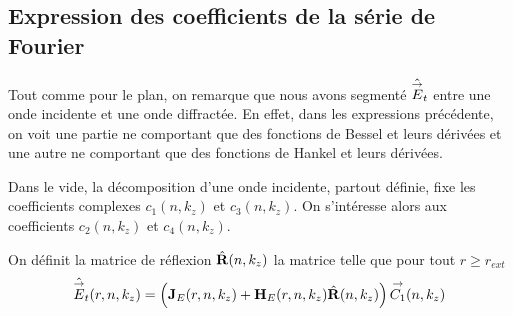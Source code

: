   \subsection{Expression des coefficients de la série de Fourier}

    Tout comme pour le plan, on remarque que nous avons segmenté \(\hat{{\overset{\rightarrow}{E}}}_t\) entre une onde incidente et une onde diffractée. En effet, dans les expressions précédente, on voit une partie ne comportant que des fonctions de Bessel et leurs dérivées et une autre ne comportant que des fonctions de Hankel et leurs dérivées.

    Dans le vide, la décomposition d'une onde incidente, partout définie, fixe les coefficients complexes \(c_1(n,k_z)\) et \(c_3(n,k_z)\). On s'intéresse alors aux coefficients \(c_2(n,k_z)\) et \(c_4(n,k_z)\).

    \begin{defn}
      On définit la matrice de réflexion \(\hat{\mathbf{R}}(n,k_z)\) la matrice telle que pour tout \(r\ge r_{ext}\)
      \begin{equation*}
        \hat{{\overset{\rightarrow}{E}}}_t(r,n,k_z) = \left(\mathbf{J}_E(r,n,k_z) + \mathbf{H}_E(r,n,k_z)\hat{\mathbf{R}}(n,k_z) \right){\overset{\rightarrow}{C_1}}(n,k_z)
      \end{equation*}
    \end{defn}

